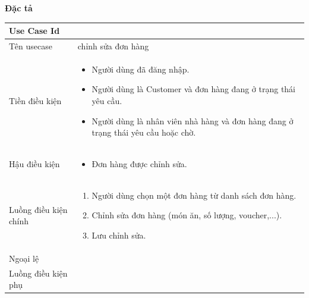 \textbf{Đặc tả}
\begin{center}{\color{black}}

    \begin{tabular}{|p{5cm}|p{7cm}|} \hline
    
        \textbf{Use Case Id} & \textbf{}  \\ \hline
        Tên usecase &   chỉnh sửa đơn hàng\\ \hline
        Tiền điều kiện &    \begin{itemize}
            \item Người dùng đã đăng nhập.
            \item Người dùng là Customer và đơn hàng đang ở trạng thái yêu cầu.
            \item Người dùng là nhân viên nhà hàng và đơn hàng đang ở trạng thái yêu cầu hoặc chờ.
        \end{itemize}\\ \hline
        Hậu điều kiện & \begin{itemize}
            \item Đơn hàng được chỉnh sửa.
        \end{itemize}

        \\ \hline
        Luồng điều kiện chính &  
            \begin{enumerate}
                \item Người dùng chọn một đơn hàng từ danh sách đơn hàng.
                \item Chỉnh sửa đơn hàng (món ăn, số lượng, voucher,...).
				\item Lưu chỉnh sửa.
            \end{enumerate}\\
        \hline
        Ngoại lệ &  \\ \hline
        Luồng điều kiện phụ &  \\ \hline
    \end{tabular}
\end{center}